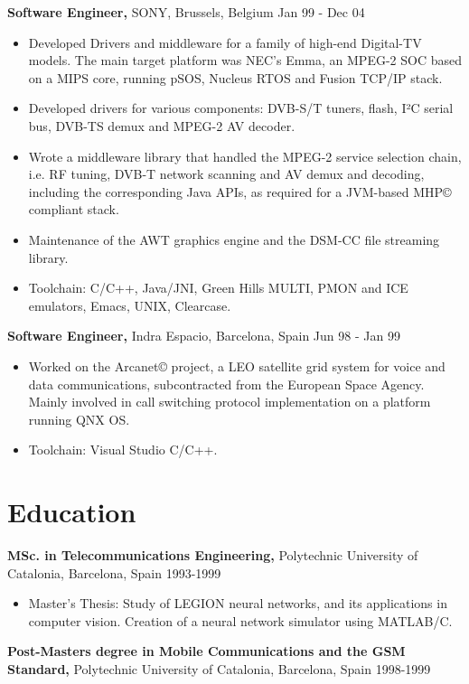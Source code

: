 \documentclass[margin]{res}
\begin{document}
\begin{resume}
{\bf Software Engineer,} SONY, Brussels, Belgium \hfill  Jan 99 - Dec 04
\begin{itemize} \itemsep -2pt %
\item Developed Drivers and middleware for a family of high-end Digital-TV models. The main target platform was NEC’s Emma, an MPEG-2 SOC based on a MIPS core, running pSOS, Nucleus RTOS and Fusion TCP/IP stack.
\item Developed drivers for various components: DVB-S/T tuners, flash, I²C serial bus, DVB-TS demux and MPEG-2 AV decoder.
\item Wrote a middleware library that handled the MPEG-2 service selection chain, i.e. RF tuning, DVB-T network scanning and AV demux and decoding, including the corresponding Java APIs, as required for a JVM-based MHP© compliant stack.
\item Maintenance of the AWT graphics engine and the DSM-CC file streaming library.
\item Toolchain: C/C++, Java/JNI, Green Hills MULTI, PMON and ICE emulators, Emacs, UNIX, Clearcase.
\end{itemize}

{\bf Software Engineer,} Indra Espacio, Barcelona, Spain \hfill  Jun 98 - Jan 99
\begin{itemize} \itemsep -2pt %
\item Worked on the Arcanet© project, a LEO satellite grid system for voice and data communications, subcontracted from the European Space Agency. Mainly involved in call switching protocol implementation on a platform running QNX OS.
\item Toolchain: Visual Studio C/C++.
\end{itemize}

\section{Education}
{ \bf MSc. in Telecommunications Engineering, } Polytechnic University of Catalonia, Barcelona, Spain \hfill 1993-1999
\begin{itemize} \itemsep -2pt
\item Master’s Thesis: Study of LEGION neural networks, and its applications in computer vision. Creation of a neural network simulator using MATLAB/C.
\end{itemize}

{ \bf Post-Masters degree in Mobile Communications and the GSM Standard, } Polytechnic University of Catalonia, Barcelona, Spain \hfill 1998-1999


\end{resume}
\end{document}
